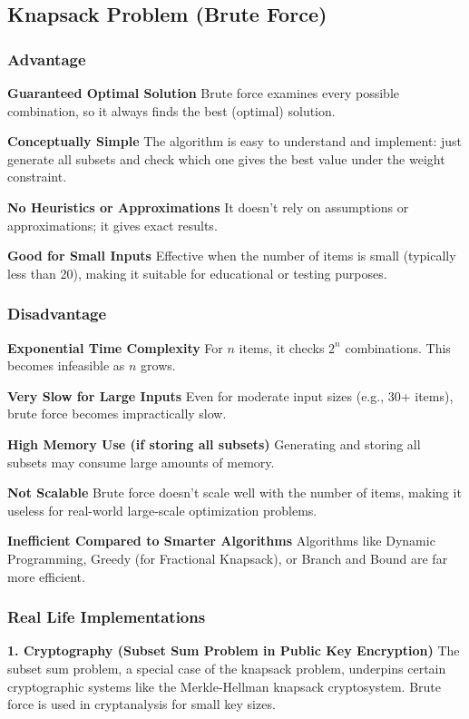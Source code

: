 \subsection{Knapsack Problem (Brute Force)}

\subsubsection{Advantage}
\textbf{Guaranteed Optimal Solution} 
Brute force examines every possible combination, so it always finds the best (optimal) solution. 

\textbf{Conceptually Simple} 
The algorithm is easy to understand and implement: just generate all subsets and check which one gives the best value under the weight constraint. 

\textbf{No Heuristics or Approximations} 
It doesn’t rely on assumptions or approximations; it gives exact results. 

\textbf{Good for Small Inputs} 
Effective when the number of items is small (typically less than 20), making it suitable for educational or testing purposes. 

\subsubsection{Disadvantage}
\textbf{Exponential Time Complexity} 
For $n$ items, it checks $2^n$ combinations. This becomes infeasible as $n$ grows. 

\textbf{Very Slow for Large Inputs} 
Even for moderate input sizes (e.g., 30+ items), brute force becomes impractically slow. 

\textbf{High Memory Use (if storing all subsets)} 
Generating and storing all subsets may consume large amounts of memory. 

\textbf{Not Scalable} 
Brute force doesn’t scale well with the number of items, making it useless for real-world large-scale optimization problems. 

\textbf{Inefficient Compared to Smarter Algorithms} 
Algorithms like Dynamic Programming, Greedy (for Fractional Knapsack), or Branch and Bound are far more efficient. 

\subsubsection{Real Life Implementations}

\textbf{1. Cryptography (Subset Sum Problem in Public Key Encryption) }
The subset sum problem, a special case of the knapsack problem, underpins certain cryptographic systems like the Merkle-Hellman knapsack cryptosystem. Brute force is used in cryptanalysis for small key sizes. 

